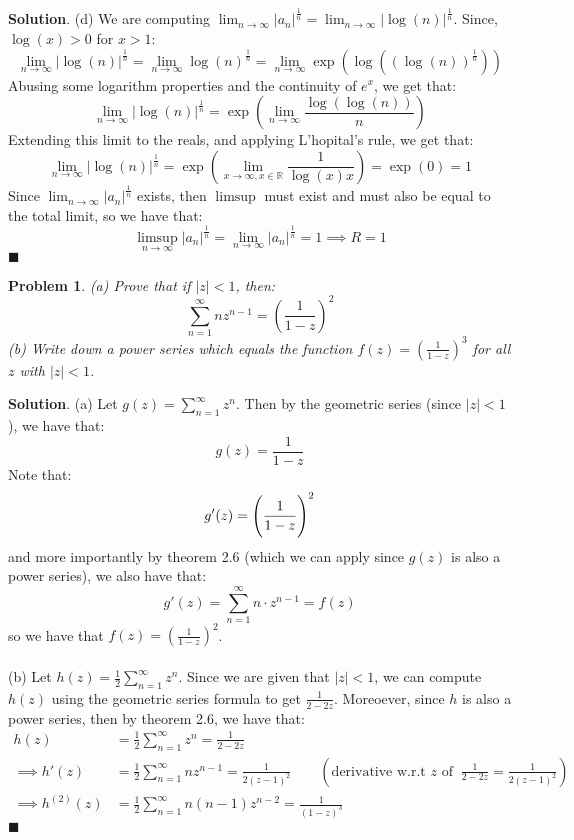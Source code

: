 \documentclass[12pt]{article}
\renewcommand{\=}[1]{\stackrel{#1}{=}} %
\providecommand{\RR}{\mathbb{R}}
\newtheorem{p}{Problem}[section]
\theoremstyle{definition}
\newenvironment{s}{%
        \begin{trivlist} \item \textbf{Solution}. }{%
            \hspace*{\fill} $\blacksquare$\end{trivlist}}%
\begin{document}
\begin{s}
    (d) We are computing $ \lim_{n\to\infty} |a_n|^{\frac{1}{n}} = \lim_{n\to\infty} |\log(n)|^{\frac{1}{n}}$. Since, $\log(x) > 0$
    for $x > 1$:
    \[ \lim_{n\to\infty}|\log(n)|^{\frac{1}{n}} = \lim_{n\to\infty}\log(n)^{\frac{1}{n}} = \lim_{n\to\infty} \exp(\log((\log(n))^{\frac{1}{n}})) \]
    Abusing some logarithm properties and the continuity of $e^x$, we get that:
    \[ \lim_{n\to\infty}|\log(n)|^{\frac{1}{n}} = \exp(\lim_{n\to\infty}\frac{\log(\log(n))}{n}) \]
    Extending this limit to the reals, and applying L'hopital's rule, we get that:
    \[ \lim_{n\to\infty}|\log(n)|^{\frac{1}{n}} = \exp(\lim_{x\to\infty,x\in\RR}\frac{1}{\log(x)x}) = \exp(0) = 1 \]
    Since $\lim_{n\to\infty}|a_n|^{\frac{1}{n}}$ exists, then $\limsup$ must exist and must also be equal to the total limit, so we have that:
    \[ \limsup_{n\to\infty} |a_n|^{\frac{1}{n}} = \lim_{n\to\infty}|a_n|^{\frac{1}{n}} = 1 \implies R = 1 \]
\end{s}

\begin{p}
    (a) Prove that if $|z| < 1$, then:
    \[ \sum_{n=1}^{\infty} nz^{n-1} = (\frac{1}{1-z})^2 \]
    (b) Write down a power series which equals the function $f(z) = (\frac{1}{1-z})^3$ for all
    $z$ with $|z| < 1$.
\end{p}
\begin{s}
    (a) Let $g(z) = \sum_{n=1}^{\infty} z^n$. Then by the geometric series (since $|z| < 1$), we have that:
    \[ g(z) = \frac{1}{1-z} \]
    Note that: 
    \[ g'(z) = \Bigg{(}\frac{1}{1-z}\Bigg{)}^2  \]
    and more importantly by theorem 2.6 (which we can apply since $g(z)$ is also a power series), we also have that:
    \[ g'(z) = \sum_{n=1}^{\infty} n\cdot z^{n-1} = f(z) \] 
    so we have that $f(z) = (\frac{1}{1-z})^2$. \\ \\

    (b) Let $h(z) = \frac{1}{2} \sum_{n=1}^{\infty} z^n$. Since we are given that $|z|<1$, we can compute $h(z)$ using the
    geometric series formula to get $\frac{1}{2-2z}$. Moreoever, since $h$ is also a power series, then by theorem 2.6, we have
    that:
    \begin{align*}
        h(z) &= \frac{1}{2}\sum_{n=1}^{\infty} z^n = \frac{1}{2-2z}\\
        \implies h'(z) &= \frac{1}{2}\sum_{n=1}^{\infty} nz^{n-1} = \frac{1}{2(z-1)^2}\qquad(\text{derivative w.r.t $z$ of }\:\frac{1}{2-2z} = \frac{1}{2(z-1)^2}) \\
        \implies h^{(2)}(z) &= \frac{1}{2}\sum_{n=1}^{\infty} n(n-1)z^{n-2} = \frac{1}{(1-z)^3}
    \end{align*}
\end{s}
\end{document}
